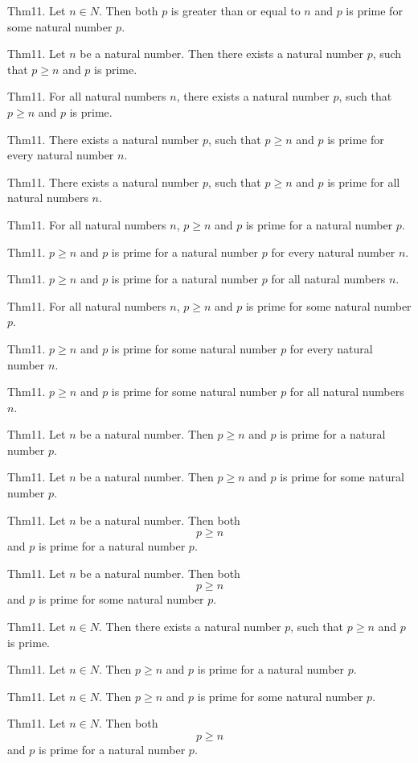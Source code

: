 \documentclass{article}
\begin{document}
Thm11. Let $n \in N$. Then both $p$ is greater than or equal to $n$ and $p$ is prime for some natural number $p$.

Thm11. Let $n$ be a natural number. Then there exists a natural number $p$, such that $p \geq n$ and $p$ is prime.

Thm11. For all natural numbers $n$, there exists a natural number $p$, such that $p \geq n$ and $p$ is prime.

Thm11. There exists a natural number $p$, such that $p \geq n$ and $p$ is prime for every natural number $n$.

Thm11. There exists a natural number $p$, such that $p \geq n$ and $p$ is prime for all natural numbers $n$.

Thm11. For all natural numbers $n$, $p \geq n$ and $p$ is prime for a natural number $p$.

Thm11. $p \geq n$ and $p$ is prime for a natural number $p$ for every natural number $n$.

Thm11. $p \geq n$ and $p$ is prime for a natural number $p$ for all natural numbers $n$.

Thm11. For all natural numbers $n$, $p \geq n$ and $p$ is prime for some natural number $p$.

Thm11. $p \geq n$ and $p$ is prime for some natural number $p$ for every natural number $n$.

Thm11. $p \geq n$ and $p$ is prime for some natural number $p$ for all natural numbers $n$.

Thm11. Let $n$ be a natural number. Then $p \geq n$ and $p$ is prime for a natural number $p$.

Thm11. Let $n$ be a natural number. Then $p \geq n$ and $p$ is prime for some natural number $p$.

Thm11. Let $n$ be a natural number. Then both $$p \geq n$$ and $p$ is prime for a natural number $p$.

Thm11. Let $n$ be a natural number. Then both $$p \geq n$$ and $p$ is prime for some natural number $p$.

Thm11. Let $n \in N$. Then there exists a natural number $p$, such that $p \geq n$ and $p$ is prime.

Thm11. Let $n \in N$. Then $p \geq n$ and $p$ is prime for a natural number $p$.

Thm11. Let $n \in N$. Then $p \geq n$ and $p$ is prime for some natural number $p$.

Thm11. Let $n \in N$. Then both $$p \geq n$$ and $p$ is prime for a natural number $p$.
\end{document}
